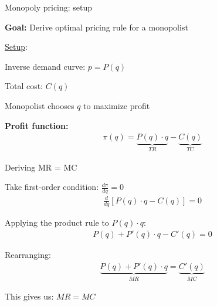 \documentclass[notes,11pt, aspectratio=169]{beamer}
\newenvironment{wideitemize}{\itemize\addtolength{\itemsep}{10pt}}{\enditemize}
\begin{document}
\begin{frame}{Monopoly pricing: setup}
\begin{wideitemize}
	\item \textbf{Goal:} Derive optimal pricing rule for a monopolist
	\item \underline{Setup}:
	\begin{wideitemize}
		\vspace{5pt}
		\item Inverse demand curve: $p = P(q)$
		\item Total cost: $C(q)$
		\item Monopolist chooses $q$ to maximize profit
	\end{wideitemize}
	\item \textbf{Profit function:}
	\begin{align*}
		\pi(q) = \underbrace{P(q) \cdot q}_{TR} - \underbrace{C(q)}_{TC}
	\end{align*}
\end{wideitemize}
\end{frame}

\begin{frame}{Deriving MR = MC}
	\begin{wideitemize}
		\item Take first-order condition: $\frac{d\pi}{dq} = 0$
		\begin{align*}
			\frac{d}{dq}\left[ P(q) \cdot q - C(q) \right] = 0
		\end{align*}
		\item Applying the product rule to $P(q) \cdot q$:
		\begin{align*}
			P(q) + P'(q) \cdot q - C'(q) = 0
		\end{align*}
		\item Rearranging:
		\begin{align*}
			\underbrace{P(q) + P'(q) \cdot q}_{MR} = \underbrace{C'(q)}_{MC}
		\end{align*}
		\item This gives us: $\boxed{MR = MC}$
	\end{wideitemize}
\end{frame}
\end{document}
